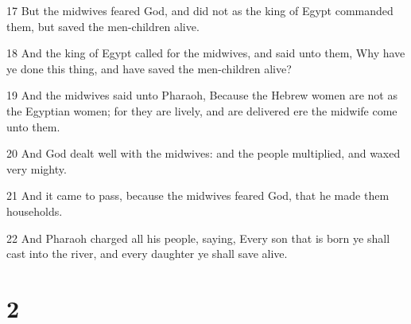 \par 17 But the midwives feared God, and did not as the king of Egypt commanded them, but saved the men-children alive.
\par 18 And the king of Egypt called for the midwives, and said unto them, Why have ye done this thing, and have saved the men-children alive?
\par 19 And the midwives said unto Pharaoh, Because the Hebrew women are not as the Egyptian women; for they are lively, and are delivered ere the midwife come unto them.
\par 20 And God dealt well with the midwives: and the people multiplied, and waxed very mighty.
\par 21 And it came to pass, because the midwives feared God, that he made them households.
\par 22 And Pharaoh charged all his people, saying, Every son that is born ye shall cast into the river, and every daughter ye shall save alive.

\chapter{2}

